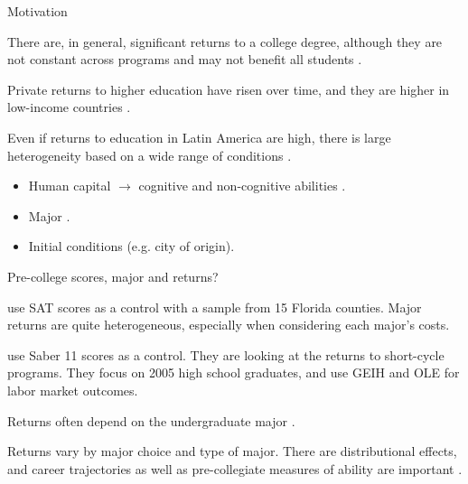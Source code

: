 \documentclass[11pt, aspectratio=169]{beamer}
\newenvironment{wideitemize}{\itemize\addtolength{\itemsep}{10pt}}{\enditemize}
\begin{document}
\begin{frame}{Motivation}
    \begin{wideitemize}
        \item There are, in general, significant returns to a college degree, although they are not constant across programs and may not benefit all students \citep{oreopoulos2013making}.
        \item Private returns to higher education have risen over time, and they are higher in low-income countries \citep{psacharopoulos2018returns}.
        \item Even if returns to education in Latin America are high, there is large heterogeneity based on a wide range of conditions \citep{ferreyra2017crossroads}.
        \begin{itemize}
            \item Human capital $\longrightarrow$ cognitive and non-cognitive abilities \citep{heckman2006effects}.
            \item Major \citep{altonji2021labor}.
            \item Initial conditions (e.g. city of origin).
        \end{itemize}
    \end{wideitemize}

\end{frame}

\begin{frame}{Pre-college scores, major and returns?}
    \begin{wideitemize}
        \item \citet{altonji2018costs} use SAT scores as a control with a sample from 15 Florida counties. Major returns are quite heterogeneous, especially when considering each major’s costs.
        \item \citet{ferreyra2022labor} use Saber 11 scores as a control. They are looking at the returns to short-cycle programs. They focus on 2005 high school graduates, and use GEIH and OLE for labor market outcomes.
        \item Returns often depend on the undergraduate major \citep{altonji2021labor}.
        \item Returns vary by major choice and type of major. There are distributional effects, and career trajectories as well as pre-collegiate measures of ability are important \citep{andrews2022returns}.
    \end{wideitemize}

\end{frame}
\end{document}
